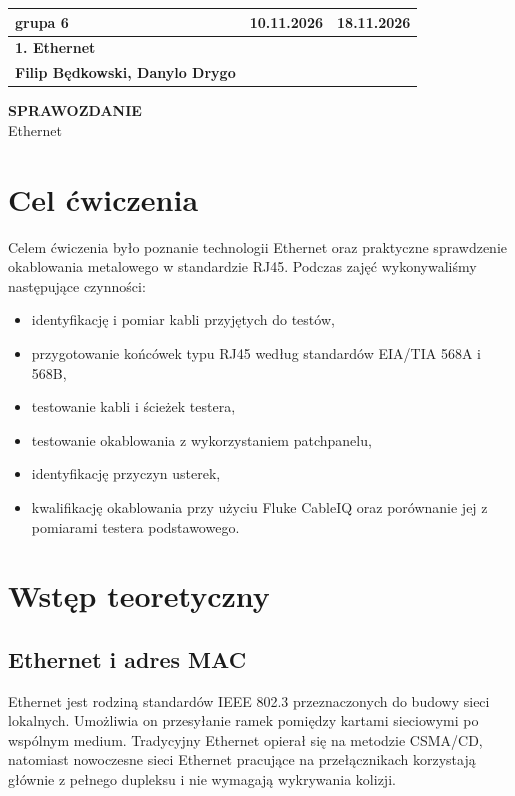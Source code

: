 \documentclass[12pt,a4paper]{article}
\begin{document}
\begin{titlepage}
\noindent
\begin{tabularx}{\textwidth}{|>{\raggedright\arraybackslash}p{}|>{\raggedright\arraybackslash}X|>{\raggedright\arraybackslash}p{}|}
\hline
\textbf{grupa 6} & \textbf{10.11.2026} & \textbf{18.11.2026} \\[8mm]
\hline
\textbf{1. Ethernet} & \multicolumn{2}{l|}{} \\[6mm]
\hline
\textbf{Filip Będkowski, Danylo Drygo} & & \textbf{} \\[8mm]
\hline
\end{tabularx}
\vfill
\begin{center}
{\Huge \textbf{SPRAWOZDANIE}\\[5mm]
\Large Ethernet}
\end{center}
\vfill
\end{titlepage}
\newpage

\section{Cel ćwiczenia}
Celem ćwiczenia było poznanie technologii Ethernet oraz praktyczne sprawdzenie okablowania metalowego w standardzie RJ45. Podczas zajęć wykonywaliśmy następujące czynności:
\begin{itemize}
  \item identyfikację i pomiar kabli przyjętych do testów,
  \item przygotowanie końcówek typu RJ45 według standardów EIA/TIA 568A i 568B,
  \item testowanie kabli i ścieżek testera,
  \item testowanie okablowania z wykorzystaniem patchpanelu,
  \item identyfikację przyczyn usterek,
  \item kwalifikację okablowania przy użyciu Fluke CableIQ oraz porównanie jej z pomiarami testera podstawowego.
\end{itemize}

\section{Wstęp teoretyczny}
\subsection{Ethernet i adres MAC}
Ethernet jest rodziną standardów IEEE 802.3 przeznaczonych do budowy sieci lokalnych. Umożliwia on przesyłanie ramek pomiędzy kartami sieciowymi po wspólnym medium. Tradycyjny Ethernet opierał się na metodzie CSMA/CD, natomiast nowoczesne sieci Ethernet pracujące na przełącznikach korzystają głównie z pełnego dupleksu i nie wymagają wykrywania kolizji.
\end{document}
